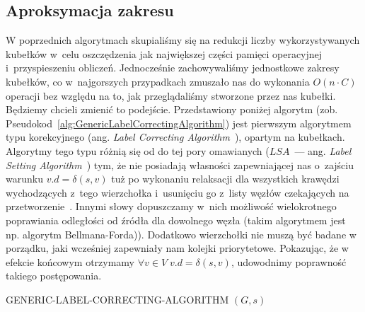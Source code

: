 \subsection{Aproksymacja zakresu}



W poprzednich algorytmach skupialiśmy się na redukcji liczby wykorzystywanych kubełków w~celu oszczędzenia jak największej części pamięci operacyjnej i~przyspieszeniu obliczeń. Jednocześnie zachowywaliśmy jednostkowe zakresy kubełków, co w~najgorszych przypadkach zmuszało nas do wykonania $O \left( n \cdot C \right)$ operacji bez względu na to, jak przeglądaliśmy stworzone przez nas kubełki. Będziemy chcieli zmienić to podejście.
Przedstawiony poniżej algorytm (zob. Pseudokod~\ref{alg:GenericLabelCorrectingAlgorithm}) jest pierwszym algorytmem typu korekcyjnego (ang. \textit{Label Correcting Algorithm}~\cite[$2.4$]{OR}), opartym na kubełkach.
Algorytmy tego typu różnią się od do tej pory omawianych ($LSA$~--- ang. \textit{Label Setting Algorithm}~\cite[$2.1$]{OR}) tym, że nie posiadają własności zapewniającej nas o~zajściu warunku $v.d = \delta \left( s, v \right)$ tuż po wykonaniu relaksacji dla wszystkich krawędzi wychodzących z~tego wierzchołka i~usunięciu go z~listy węzłów czekających na przetworzenie~\cite[$17$]{OR}.
Innymi słowy dopuszczamy w~nich możliwość wielokrotnego poprawiania odległości od źródła dla dowolnego węzła (takim algorytmem jest np. algorytm Bellmana-Forda)).
Dodatkowo wierzchołki nie muszą być badane w porządku, jaki wcześniej zapewniały nam kolejki priorytetowe.
Pokazując, że w efekcie końcowym otrzymamy $\forall v \in V \; v.d = \delta \left( s, v \right)$, udowodnimy poprawność takiego postępowania.

\begin{pseudokod}[!htbp]
	\DontPrintSemicolon
	\caption{
		GENERIC-LABEL-CORRECTING-ALGORITHM $\left( G, s \right)$
	}
	\label{alg:GenericLabelCorrectingAlgorithm}
\end{pseudokod}

